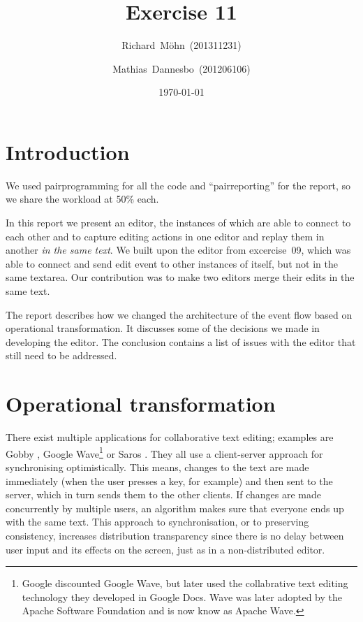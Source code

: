 \documentclass[a4paper,final,12pt,oneside,article,table]{memoir}
\newcommand{\supertitle}[1]{\gdef\suP{#1}}
\newcommand{\subtitle}[1]{\gdef\suB{#1}}
\newcommand{\stunum}[1]{\gdef\stuN{#1}}
\begin{document}
\supertitle{Distributed Systems}
\title{Exercise 11}
\author{Richard~Möhn~\small{(201311231)} \and Mathias~Dannesbo~\small{(201206106)}}
\date{\today}
\maketitle

\chapter{Introduction}
We used pairprogramming for all the code and ``pairreporting'' for the
report, so we share the workload at 50\% each.

In this report we present an editor, the instances of which are able to
connect to each other and to capture editing actions in one editor and
replay them in another \textit{in the same text}.  We built upon the
editor from excercise~09, which was able to connect and send edit event
to other instances of itself, but not in the same textarea. Our
contribution was to make two editors merge their edits in the same
text.

The report describes how we changed the architecture of the event flow
based on operational transformation. It discusses some of the
decisions we made in developing the editor. The conclusion contains a
list of issues with the editor that still need to be addressed.

\chapter{Operational transformation}

There exist multiple applications for collaborative text editing;
examples are Gobby \cite{Gobby}, Google Wave\footnote{Google
  discounted Google Wave, but later used the collabrative text editing
  technology they developed in Google Docs. Wave was later adopted by
  the Apache Software Foundation and is now know as Apache Wave.}
\Cite{GoogleWave} or Saros \cite{Saros}. They all use a client-server
approach for synchronising optimistically. This means, changes to the
text are made immediately (when the user presses a key, for example)
and then sent to the server, which in turn sends them to the other
clients. If changes are made concurrently by multiple users, an
algorithm makes sure that everyone ends up with the same text. This
approach to synchronisation, or to preserving consistency, increases
distribution transparency since there is no delay between user input
and its effects on the screen, just as in a non-distributed editor.
\end{document}
